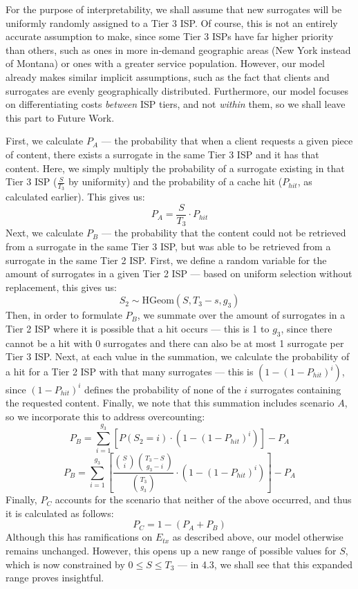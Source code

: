 \documentclass[
	a4paper, %
	10pt, %
	unnumberedsections, %
	twoside, %
]{LTJournalArticle}
\begin{document}
For the purpose of interpretability, we shall assume that new surrogates will be uniformly randomly assigned to a Tier 3 ISP. Of course, this is not an entirely accurate assumption to make, since some Tier 3 ISPs have far higher priority than others, such as ones in more in-demand geographic areas (New York instead of Montana) or ones with a greater service population. However, our model already makes similar implicit assumptions, such as the fact that clients and surrogates are evenly geographically distributed. Furthermore, our model focuses on differentiating costs \textit{between} ISP tiers, and not \textit{within} them, so we shall leave this part to Future Work.

First, we calculate $P_A$ --- the probability that when a client requests a given piece of content, there exists a surrogate in the same Tier 3 ISP and it has that content. Here, we simply multiply the probability of a surrogate existing in that Tier 3 ISP ($\frac{S}{T_3}$ by uniformity) and the probability of a cache hit ($P_{hit}$, as calculated earlier). This gives us:
\[P_A = \frac{S}{T_3} \cdot P_{hit}\]
Next, we calculate $P_B$ --- the probability that the content could not be retrieved from a surrogate in the same Tier 3 ISP, but was able to be retrieved from a surrogate in the same Tier 2 ISP. First, we define a random variable for the amount of surrogates in a given Tier 2 ISP --- based on uniform selection without replacement, this gives us:
\[S_2 \sim \textrm{HGeom}(S, T_3-s, g_3)\]
Then, in order to formulate $P_B$, we summate over the amount of surrogates in a Tier 2 ISP where it is possible that a hit occurs --- this is 1 to $g_3$, since there cannot be a hit with 0 surrogates and there can also be at most 1 surrogate per Tier 3 ISP. Next, at each value in the summation, we calculate the probability of a hit for a Tier 2 ISP with that many surrogates --- this is $(1 - (1 - P_{hit})^i)$, since $(1 - P_{hit})^i$ defines the probability of none of the $i$ surrogates containing the requested content. Finally, we note that this summation includes scenario $A$, so we incorporate this to address overcounting:
\[P_B = \sum^{g_3}_{i=1}[P(S_2 = i) \cdot (1 - (1 - P_{hit})^i)] - P_A\]
\[P_B = \sum^{g_3}_{i=1}\left[\frac{\binom{S}{i}\binom{T_3-S}{g_3 - i}}{\binom{T_3}{g_3}} \cdot (1 - (1 - P_{hit})^i)\right] - P_A\]
Finally, $P_C$ accounts for the scenario that neither of the above occurred, and thus it is calculated as follows:
\[ P_C = 1 - (P_A + P_B)\]
Although this has ramifications on $E_{tx}$ as described above, our model otherwise remains unchanged. However, this opens up a new range of possible values for $S$, which is now constrained by $0 \leq S \leq T_3$ --- in 4.3, we shall see that this expanded range proves insightful.
\end{document}
